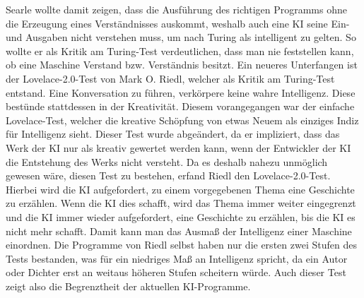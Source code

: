 Searle wollte damit zeigen, dass die Ausführung des richtigen Programms ohne die Erzeugung eines Verständnisses auskommt, weshalb auch eine KI seine Ein- und Ausgaben nicht verstehen muss, um nach Turing als intelligent zu gelten.
So wollte er als Kritik am Turing-Test verdeutlichen, dass man nie feststellen kann, ob eine Maschine Verstand bzw. Verständnis besitzt.
Ein neueres Unterfangen ist der Lovelace-2.0-Test von Mark O.
Riedl, welcher als Kritik am Turing-Test entstand.
Eine Konversation zu führen, verkörpere keine wahre Intelligenz.
Diese bestünde stattdessen in der Kreativität.
Diesem vorangegangen war der einfache Lovelace-Test, welcher die kreative Schöpfung von etwas Neuem als einziges Indiz für Intelligenz sieht.
Dieser Test wurde abgeändert, da er impliziert, dass das Werk der KI nur als kreativ gewertet werden kann, wenn der Entwickler der KI die Entstehung des Werks nicht versteht.
Da es deshalb nahezu unmöglich gewesen wäre, diesen Test zu bestehen, erfand Riedl den Lovelace-2.0-Test.
Hierbei wird die KI aufgefordert, zu einem vorgegebenen Thema eine Geschichte zu erzählen.
Wenn die KI dies schafft, wird das Thema immer weiter eingegrenzt und die KI immer wieder aufgefordert, eine Geschichte zu erzählen, bis die KI es nicht mehr schafft.
Damit kann man das Ausmaß der Intelligenz einer Maschine einordnen.
Die Programme von Riedl selbst haben nur die ersten zwei Stufen des Tests bestanden, was für ein niedriges Maß an Intelligenz spricht, da ein Autor oder Dichter erst an weitaus höheren Stufen scheitern würde.
Auch dieser Test zeigt also die Begrenztheit der aktuellen KI-Programme.

